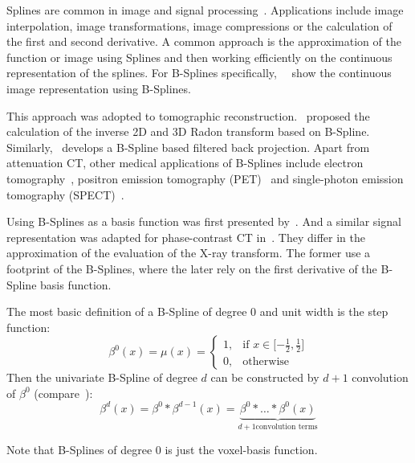 Splines are common in image and signal processing~\cite{unser_splines_1999}. Applications include
image interpolation, image transformations, image compressions or the calculation of the first and
second derivative. A common approach is the approximation of the function or image using Splines and
then working efficiently on the continuous representation of the splines. For B-Splines
specifically,~\citeauthor{unser_fast_1991}~\cite{unser_fast_1991} show the continuous image
representation using B-Splines.

This approach was adopted to tomographic reconstruction.~\cite{la_riviere_spline-based_1998}
proposed the calculation of the inverse 2D and 3D Radon transform based on B-Spline.
Similarly,~\cite{horbelt_discretization_2002} develops a B-Spline based filtered back projection.
Apart from attenuation CT, other medical applications of B-Splines include electron
tomography~\cite{tran_robust_2013, tran_inverse_2014}, positron emission tomography
(PET)~\cite{nichols_spatiotemporal_2002, li_fast_2007, verhaeghe_investigation_2007} and
single-photon emission tomography (SPECT)~\cite{guedon_b-spline_1991, reutter_fully_2007}.

Using B-Splines as a basis function was first presented by~\cite{momey_new_2011,
	momey_b-spline_2012, momey_spline_2015}. And a similar signal representation was adapted for
phase-contrast CT in~\cite{nilchian_fast_2013, nilchian_differential_2012, nilchian_spline_2015}.
They differ in the approximation of the evaluation of the X-ray transform. The former use a
footprint of the B-Splines, where the later rely on the first derivative of the B-Spline basis
function.

\begin{definition}[B-Spline]
	The most basic definition of a B-Spline of degree \(0\) and unit width is the step function:
	\begin{equation}
		\beta^0(x) = \mu(x) =
		\begin{cases}
			1, & \text{if } x \in \mathopen[\minus \frac{1}{2}, \frac{1}{2}\mathclose] \\
			0, & \text{otherwise}
		\end{cases}
	\end{equation}
	Then the univariate B-Spline of degree \(d\) can be constructed by \(d + 1\) convolution of \(\beta^0\)
	(compare~\cite{momey_new_2011}):
	\begin{equation}
		\beta^d(x) = \beta^0 * \beta^{d-1}(x) =
		\underbrace{\beta^0 * \dots * \beta^0(x)}_{d+1 \text{convolution terms}}
	\end{equation}
\end{definition}
Note that B-Splines of degree \(0\) is just the voxel-basis function.

